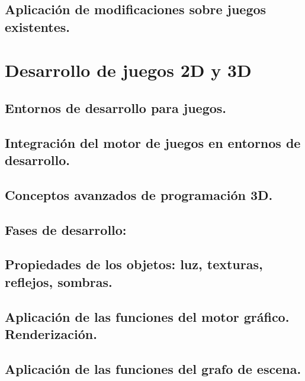 \documentclass[a4paper,12pt,spanish]{sphinxmanual}
\begin{document}
\section{Aplicación de modificaciones sobre juegos existentes.}
\label{index:aplicacion-de-modificaciones-sobre-juegos-existentes}

\chapter{Desarrollo de juegos 2D y 3D}
\label{index:desarrollo-de-juegos-2d-y-3d}

\section{Entornos de desarrollo para juegos.}
\label{index:entornos-de-desarrollo-para-juegos}

\section{Integración del motor de juegos en entornos de desarrollo.}
\label{index:integracion-del-motor-de-juegos-en-entornos-de-desarrollo}

\section{Conceptos avanzados de programación 3D.}
\label{index:conceptos-avanzados-de-programacion-3d}

\section{Fases de desarrollo:}
\label{index:fases-de-desarrollo}

\section{Propiedades de los objetos: luz, texturas, reflejos, sombras.}
\label{index:propiedades-de-los-objetos-luz-texturas-reflejos-sombras}

\section{Aplicación de las funciones del motor gráfico. Renderización.}
\label{index:aplicacion-de-las-funciones-del-motor-grafico-renderizacion}

\section{Aplicación de las funciones del grafo de escena.}
\label{index:aplicacion-de-las-funciones-del-grafo-de-escena}
\end{document}

